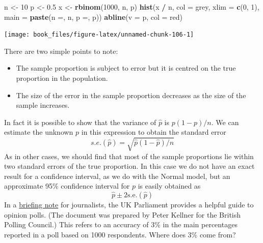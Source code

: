 \documentclass[
]{book}
\newenvironment{Shaded}{\begin{snugshade}}{\end{snugshade}}
\newcommand{\AttributeTok}[1]{\textcolor[rgb]{0.13,0.29,0.53}{#1}}
\newcommand{\DecValTok}[1]{\textcolor[rgb]{0.00,0.00,0.81}{#1}}
\newcommand{\FloatTok}[1]{\textcolor[rgb]{0.00,0.00,0.81}{#1}}
\newcommand{\FunctionTok}[1]{\textcolor[rgb]{0.13,0.29,0.53}{\textbf{#1}}}
\newcommand{\NormalTok}[1]{#1}
\newcommand{\OtherTok}[1]{\textcolor[rgb]{0.56,0.35,0.01}{#1}}
\newcommand{\SpecialCharTok}[1]{\textcolor[rgb]{0.81,0.36,0.00}{\textbf{#1}}}
\newcommand{\StringTok}[1]{\textcolor[rgb]{0.31,0.60,0.02}{#1}}
\providecommand{\tightlist}{%
  \setlength{\itemsep}{0pt}\setlength{\parskip}{0pt}}
\begin{document}
\begin{Shaded}
\begin{Highlighting}[]
\NormalTok{n }\OtherTok{\textless{}{-}} \DecValTok{10}
\NormalTok{p }\OtherTok{\textless{}{-}} \FloatTok{0.5}
\NormalTok{x }\OtherTok{\textless{}{-}} \FunctionTok{rbinom}\NormalTok{(}\DecValTok{1000}\NormalTok{, n, p) }
\FunctionTok{hist}\NormalTok{(x }\SpecialCharTok{/}\NormalTok{ n, }\AttributeTok{col =} \StringTok{\textquotesingle{}grey\textquotesingle{}}\NormalTok{, }\AttributeTok{xlim =} \FunctionTok{c}\NormalTok{(}\DecValTok{0}\NormalTok{, }\DecValTok{1}\NormalTok{), }\AttributeTok{main =} \FunctionTok{paste}\NormalTok{(}\StringTok{\textquotesingle{}n =\textquotesingle{}}\NormalTok{, n, }\StringTok{\textquotesingle{}  p =\textquotesingle{}}\NormalTok{, p))}
\FunctionTok{abline}\NormalTok{(}\AttributeTok{v =}\NormalTok{ p, }\AttributeTok{col =} \StringTok{\textquotesingle{}red\textquotesingle{}}\NormalTok{)}
\end{Highlighting}
\end{Shaded}

\begin{center}\texttt{[image: book\_files/figure-latex/unnamed-chunk-106-1]} \end{center}

There are two simple points to note:

\begin{itemize}
\tightlist
\item
  The sample proportion is subject to error but it is centred
  on the true proportion in the population.
\item
  The size of the error in the sample proportion decreases as the
  size of the sample increases.
\end{itemize}

In fact it is possible to show that the variance of \(\hat{p}\) is \(p (1 - p) / n\). We can estimate the unknown \(p\) in this expression to obtain the standard error
\[
        s.e.(\hat{p}) = \sqrt{\hat{p}(1-\hat{p})/n}
\]
As in other cases, we should find that most of the sample proportions lie within two standard errors of the true proportion. In this case we do not have an exact result for a confidence interval, as we do with the Normal model, but an approximate 95\% confidence interval for \(p\) is easily obtained as
\[
                \hat{p} \pm 2 \mbox{s.e.}(\hat{p})
\]
In a \href{https://publications.parliament.uk/pa/ld201719/ldselect/ldppdm/106/10616.htm}{briefing note} for journalists, the UK Parliament provides a helpful guide to opinion polls. (The document was prepared by Peter Kellner for the British Polling Council.) This refers to an accuracy of 3\% in the main percentages reported in a poll based on 1000 respondents. Where does 3\% come from?
\end{document}
